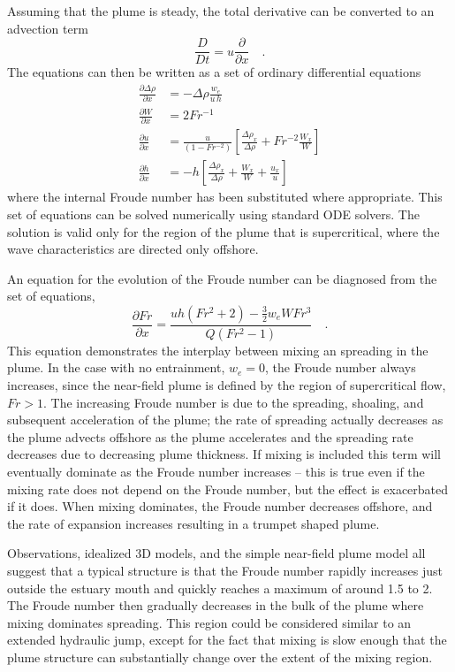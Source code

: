 \documentclass[12pt]{article}
\begin{document}
Assuming that the plume is steady, the total derivative can be converted to an advection term
\begin{equation}
    \frac{D}{Dt} = u\frac{\partial}{\partial x} \quad .
\end{equation}
The equations can then be written as a set of ordinary differential equations
\begin{align}
\frac{\partial \Delta\rho}{\partial x} &= - \Delta \rho \frac{w_e}{u\,h} \label{eq:mass_sys}\\
\frac{\partial W}{\partial x} &=  2 Fr^{-1}\label{eq:width_sys}\\
\frac{\partial u}{\partial x} &= \frac{u}{(1 - Fr^{-2})}\left[ \frac{\Delta \rho_x}{\Delta \rho} + Fr^{-2} \frac{W_x}{W} \right] \label{eq:moment_sys}\\
\frac{\partial h}{\partial x} &= - h \left[  \frac{\Delta\rho_x}{\Delta\rho} + \frac{W_x}{W} +  \frac{u_x}{u} \right] \label{eq:cont_sys}
\end{align}
where the internal Froude number has been substituted where appropriate. This set of equations can be solved numerically using standard ODE solvers. The solution is valid only for the region of the plume that is supercritical, where the wave characteristics are directed only offshore.

An equation for the evolution of the Froude number can be diagnosed from the set of equations, 
\begin{equation}
\frac{\partial Fr}{\partial x} = \frac{ u h (Fr^2+2) - \frac{3}{2} w_e W  Fr^3}{ Q (Fr^2-1)} \quad .
\label{eq:Fr_x}
\end{equation}
This equation demonstrates the interplay between mixing an spreading in the plume. In the case with no entrainment, $w_e = 0$, the Froude number always increases, since the near-field plume is defined by the region of supercritical flow, $Fr>1$. The increasing Froude number is due to the spreading, shoaling, and subsequent acceleration of the plume; the rate of spreading actually decreases as the plume advects offshore as the plume accelerates and the spreading rate decreases due to decreasing plume thickness. If mixing is included this term will eventually dominate as the Froude number increases -- this is true even if the mixing rate does not depend on the Froude number, but the effect is exacerbated if it does. When mixing dominates, the Froude number decreases offshore, and the rate of expansion increases resulting in a trumpet shaped plume. 

Observations, idealized 3D models, and the simple near-field plume model all suggest that a typical structure is that the Froude number rapidly increases just outside the estuary mouth and quickly reaches a maximum of around 1.5 to 2. The Froude number then gradually decreases in the bulk of the plume where mixing dominates spreading. This region could be considered similar to an extended hydraulic jump, except for the fact that mixing is slow enough that the plume structure can substantially change over the extent of the mixing region.
\end{document}
